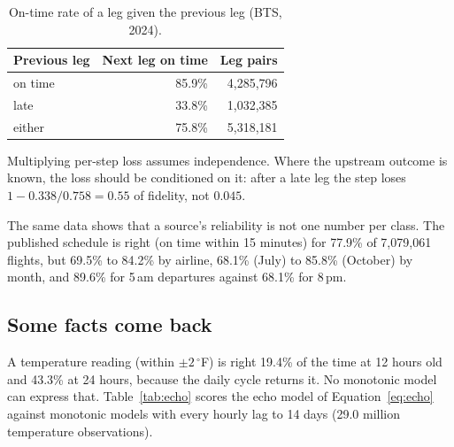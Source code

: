 \begin{table}[t]
\centering
\small
\caption{On-time rate of a leg given the previous leg (BTS, 2024).}
\label{tab:legs}
\begin{tabular}{lrr}
\toprule
Previous leg & Next leg on time & Leg pairs \\
\midrule
on time & 85.9\% & 4{,}285{,}796 \\
late & 33.8\% & 1{,}032{,}385 \\
either & 75.8\% & 5{,}318{,}181 \\
\bottomrule
\end{tabular}
\end{table}

Multiplying per-step loss assumes independence. Where the upstream outcome
is known, the loss should be conditioned on it: after a late leg the step
loses $1 - 0.338/0.758 = 0.55$ of fidelity, not $0.045$.

The same data shows that a source's reliability is not one number per
class. The published schedule is right (on time within 15 minutes) for
77.9\% of 7{,}079{,}061 flights, but 69.5\% to 84.2\% by airline, 68.1\%
(July) to 85.8\% (October) by month, and 89.6\% for 5\,am departures
against 68.1\% for 8\,pm.

\subsection{Some facts come back}\label{sec:results-echo}

A temperature reading (within $\pm 2\,^\circ$F) is right 19.4\% of the time
at 12 hours old and 43.3\% at 24 hours, because the daily cycle returns it.
No monotonic model can express that. Table~\ref{tab:echo} scores the echo
model of Equation~\eqref{eq:echo} against monotonic models with every hourly
lag to 14 days (29.0 million temperature observations).

